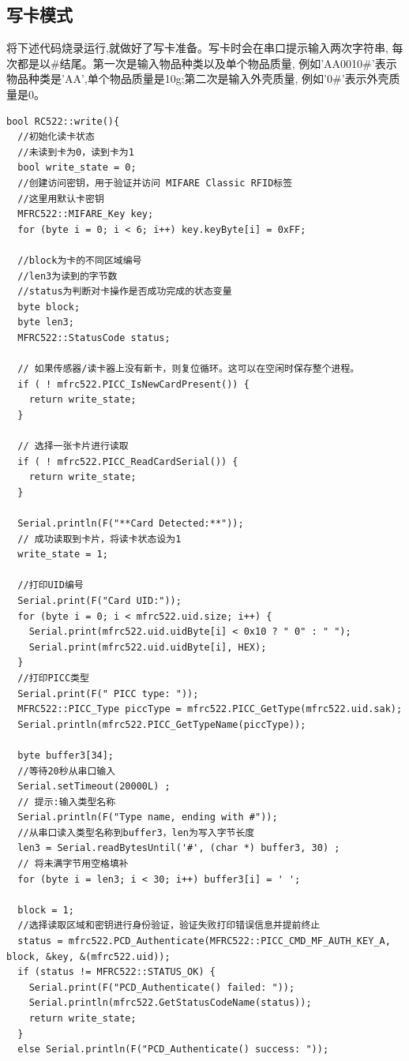 \documentclass{article}
\begin{document}
\subsection{写卡模式}
将下述代码烧录运行,就做好了写卡准备。写卡时会在串口提示输入两次字符串, 每次都是以\#结尾。第一次是输入物品种类以及单个物品质量, 例如'AA0010\#'表示
物品种类是'AA',单个物品质量是10g;第二次是输入外壳质量, 例如'0\#'表示外壳质量是0。
\begin{lstlisting}
bool RC522::write(){
  //初始化读卡状态
  //未读到卡为0，读到卡为1
  bool write_state = 0;
  //创建访问密钥，用于验证并访问 MIFARE Classic RFID标签
  //这里用默认卡密钥
  MFRC522::MIFARE_Key key;
  for (byte i = 0; i < 6; i++) key.keyByte[i] = 0xFF;

  //block为卡的不同区域编号
  //len3为读到的字节数
  //status为判断对卡操作是否成功完成的状态变量
  byte block;
  byte len3;
  MFRC522::StatusCode status;

  // 如果传感器/读卡器上没有新卡，则复位循环。这可以在空闲时保存整个进程。
  if ( ! mfrc522.PICC_IsNewCardPresent()) {
    return write_state;
  }

  // 选择一张卡片进行读取
  if ( ! mfrc522.PICC_ReadCardSerial()) {
    return write_state;
  }

  Serial.println(F("**Card Detected:**"));
  // 成功读取到卡片，将读卡状态设为1
  write_state = 1;
  
  //打印UID编号
  Serial.print(F("Card UID:"));    
  for (byte i = 0; i < mfrc522.uid.size; i++) {
    Serial.print(mfrc522.uid.uidByte[i] < 0x10 ? " 0" : " ");
    Serial.print(mfrc522.uid.uidByte[i], HEX);
  }
  //打印PICC类型
  Serial.print(F(" PICC type: "));   
  MFRC522::PICC_Type piccType = mfrc522.PICC_GetType(mfrc522.uid.sak);
  Serial.println(mfrc522.PICC_GetTypeName(piccType));  

  byte buffer3[34];
  //等待20秒从串口输入
  Serial.setTimeout(20000L) ;     
  // 提示:输入类型名称
  Serial.println(F("Type name, ending with #"));
  //从串口读入类型名称到buffer3，len为写入字节长度
  len3 = Serial.readBytesUntil('#', (char *) buffer3, 30) ; 
  // 将未满字节用空格填补
  for (byte i = len3; i < 30; i++) buffer3[i] = ' ';     

  block = 1;
  //选择读取区域和密钥进行身份验证，验证失败打印错误信息并提前终止
  status = mfrc522.PCD_Authenticate(MFRC522::PICC_CMD_MF_AUTH_KEY_A, block, &key, &(mfrc522.uid));
  if (status != MFRC522::STATUS_OK) {
    Serial.print(F("PCD_Authenticate() failed: "));
    Serial.println(mfrc522.GetStatusCodeName(status));
    return write_state;
  }
  else Serial.println(F("PCD_Authenticate() success: "));


\end{lstlisting}
\end{document}
